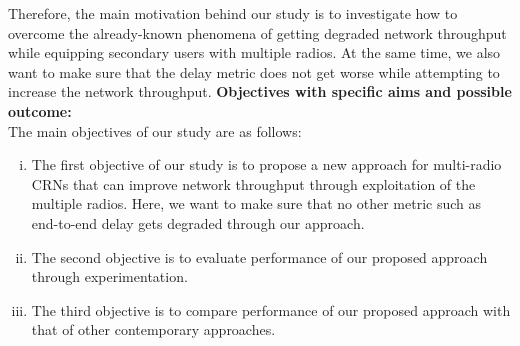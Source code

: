 \documentclass[12pt,addpoints,fleqn]{exam}
\begin{document}
\begin{questions}
Therefore, the main motivation behind our study is to investigate how to overcome the already-known phenomena of getting degraded network throughput while equipping secondary users with multiple radios. At the same time, we also want to make sure that the delay metric does not get worse while attempting to increase the network throughput.
{\bfseries \question
\textbf{Objectives with specific aims and possible outcome:}}\\
The main objectives of our study are as follows:
\begin{enumerate}[i.]
    \item The first objective of our study is to propose a new approach for multi-radio CRNs that can improve network throughput through exploitation of the multiple radios. Here, we want to make sure that no other metric such as end-to-end delay gets degraded through our approach.
    \item The second objective is to evaluate performance of our proposed approach through experimentation.
    \item The third objective is to compare performance of our proposed approach with that of other contemporary approaches.
\end{enumerate}


\end{questions}
\end{document}
